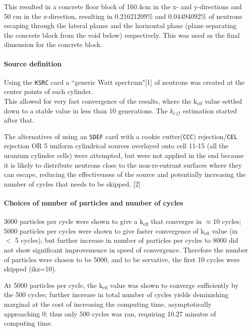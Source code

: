 \documentclass[a4paper, 12pt]{article}
\begin{document}
This resulted in a concrete floor block of 160.4cm in the x- and y-directions and 50 cm in the z-direction, resulting in 0.21621209\%  and 0.04494092\% of neutrons escaping through the lateral planes and the horizontal plane (plane separating the concrete block from the void below) respectively. This was used as the final dimension for the concrete block.

\paragraph{Source definition}
Using the \texttt{KSRC} card a ``generic Watt spectrum"[1] of neutrons was created at the center points of each cylinder.
\\This allowed for very fast convergence of the results, where the $\text{k}_{\text{eff}}$ value settled down to a stable value in less than 10 generations. The $k_{eff}$ estimation started after that.

The alternatives of using an \texttt{SDEF} card with a cookie cutter(\texttt{CCC}) rejection/\texttt{CEL} rejection OR 5 uniform cylindrical sources overlayed onto cell 11-15 (all the uranium cylinder cells) were attempted, but were not applied in the end because it is likely to distribute neutrons close to the non-re-entrant surfaces where they can escape, reducing the effectiveness of the source and potentially increasing the number of cycles that needs to be skipped. [2]

\paragraph{Choices of number of particles and number of cycles}
3000 particles per cycle were shown to give a $\text{k}_{\text{eff}}$ that converges in $\approx$10 cycles; 5000 particles per cycles were shown to give faster convergence of $\text{k}_{\text{eff}}$ value (in $<$ 5 cycles), but further increase in number of particles per cycles to 8000 did not show significant improvemence in speed of convergence. Therefore the number of particles were chosen to be 5000, and to be servative, the first 10 cycles were skipped (ikz=10).

At 5000 particles per cycle, the $\text{k}_{\text{eff}}$ value was shown to converge sufficiently by the 500 cycles; further increase in total number of cycles yields deminishing marginal at the cost of increasing the computing time, asymptotically approaching 0; thus only 500 cycles was ran, requiring 10.27 minutes of computing time.
\end{document}
